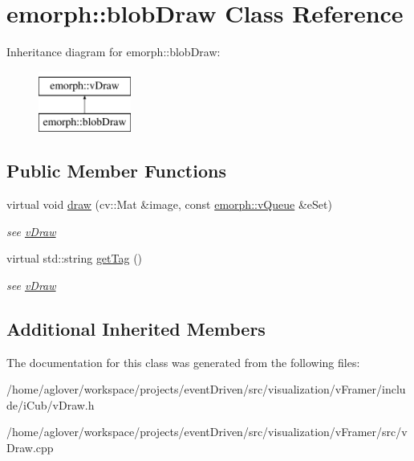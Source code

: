 \hypertarget{classemorph_1_1blobDraw}{\section{emorph\-:\-:blob\-Draw Class Reference}
\label{classemorph_1_1blobDraw}
}
Inheritance diagram for emorph\-:\-:blob\-Draw\-:\begin{figure}[H]
\begin{center}
\leavevmode
\includegraphics[height=2.000000cm]{classemorph_1_1blobDraw}
\end{center}
\end{figure}
\subsection*{Public Member Functions}
\begin{DoxyCompactItemize}
\item 
\hypertarget{classemorph_1_1blobDraw_af2be44e448d04221db47e9b21b03aeec}{virtual void \hyperlink{classemorph_1_1blobDraw_af2be44e448d04221db47e9b21b03aeec}{draw} (cv\-::\-Mat \&image, const \hyperlink{classemorph_1_1vQueue}{emorph\-::v\-Queue} \&e\-Set)}\label{classemorph_1_1blobDraw_af2be44e448d04221db47e9b21b03aeec}

\begin{DoxyCompactList}\small\item\em see \hyperlink{classemorph_1_1vDraw}{v\-Draw} \end{DoxyCompactList}\item 
\hypertarget{classemorph_1_1blobDraw_ad0970eb3689b4fb08aec786184ec2f92}{virtual std\-::string \hyperlink{classemorph_1_1blobDraw_ad0970eb3689b4fb08aec786184ec2f92}{get\-Tag} ()}\label{classemorph_1_1blobDraw_ad0970eb3689b4fb08aec786184ec2f92}

\begin{DoxyCompactList}\small\item\em see \hyperlink{classemorph_1_1vDraw}{v\-Draw} \end{DoxyCompactList}\end{DoxyCompactItemize}
\subsection*{Additional Inherited Members}


The documentation for this class was generated from the following files\-:\begin{DoxyCompactItemize}
\item 
/home/aglover/workspace/projects/event\-Driven/src/visualization/v\-Framer/include/i\-Cub/v\-Draw.\-h\item 
/home/aglover/workspace/projects/event\-Driven/src/visualization/v\-Framer/src/v\-Draw.\-cpp\end{DoxyCompactItemize}
